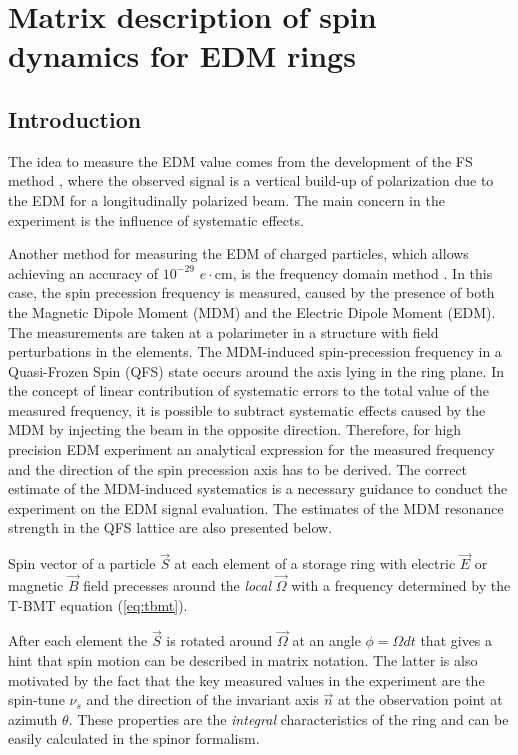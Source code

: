 \newpage

\section{Matrix description of spin dynamics for EDM rings}
\label{sec:spinor}


\subsection{Introduction}
The idea to measure the EDM value comes from the development of the FS method \cite{srEDM:2008, Farley:2004hp}, where the observed signal is a vertical build-up of polarization due to the EDM for a longitudinally polarized beam. The main concern in the experiment is the influence of systematic effects. 

Another method for measuring the EDM of charged particles, which allows achieving an accuracy of $10^{-29}$ $e\cdot$cm,
is the frequency domain method \cite{Senichev:Freq_domain_method}. In this case, the spin precession frequency is measured, caused by the presence of both the Magnetic Dipole Moment (MDM) and the Electric Dipole Moment (EDM). The measurements are taken at a polarimeter in a structure with field perturbations in the elements. The MDM-induced spin-precession frequency in a Quasi-Frozen Spin (QFS)  \cite{Senichev:QFS_IPAC22} state occurs around the axis lying in the ring plane. In the concept of linear contribution of systematic errors to the total value of the measured frequency, it is possible to
subtract systematic effects caused by the MDM by injecting
the beam in the opposite direction. Therefore, for high precision EDM experiment an analytical expression for the measured frequency and the direction of the spin precession axis has to be derived. The correct estimate of the MDM-induced systematics is a necessary guidance to conduct the experiment on the EDM signal evaluation. The estimates of the MDM resonance strength in the QFS lattice are also presented below.

Spin vector of a particle $\vec{S}$ at each element of a storage ring with electric $\vec{E}$ or magnetic $\vec{B}$ field precesses around the \textit{local} $\vec{\Omega}$ with a frequency determined by the T-BMT equation (\ref{eq:tbmt}).

After each element the $\vec{S}$ is rotated around $\vec{\Omega}$ at an angle $\phi=\Omega dt$ that gives a hint that spin motion can be described in matrix notation. The latter is also motivated by the fact that the key measured values in the experiment are the spin-tune $\nu_s$ and the direction of the invariant axis $\vec{n}$ at the observation point at azimuth $\theta$. These properties are the \textit{integral} characteristics of the ring and can be easily calculated in the spinor formalism. 

